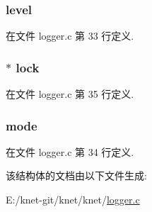 \subsubsection[{level}]{ level}\label{struct__logger__t_a1187947f1946be67ece2cfc21e72a6cb}


在文件 logger.\+c 第 33 行定义.

\hypertarget{struct__logger__t_abf14bc3bc3eb5e72e92811fcc36b5063}{}
\subsubsection[{lock}]{$\ast$ lock}\label{struct__logger__t_abf14bc3bc3eb5e72e92811fcc36b5063}


在文件 logger.\+c 第 35 行定义.

\hypertarget{struct__logger__t_ad4dba8d44f147173e40f1f5f753cbf3b}{}
\subsubsection[{mode}]{ mode}\label{struct__logger__t_ad4dba8d44f147173e40f1f5f753cbf3b}


在文件 logger.\+c 第 34 行定义.



该结构体的文档由以下文件生成\+:\begin{DoxyCompactItemize}
\item 
E\+:/knet-\/git/knet/knet/\hyperlink{logger_8c}{logger.\+c}\end{DoxyCompactItemize}
